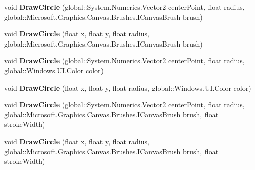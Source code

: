 \begin{DoxyCompactItemize}
void {\bfseries Draw\+Circle} (global\+::\+System.\+Numerics.\+Vector2 center\+Point, float radius, global\+::\+Microsoft.\+Graphics.\+Canvas.\+Brushes.\+I\+Canvas\+Brush brush)
\item 
\mbox{\label{interface_microsoft_1_1_graphics_1_1_canvas_1_1_i_canvas_drawing_session_af7c160387eafb948f3c310d4ae7f78d2}} 
void {\bfseries Draw\+Circle} (float x, float y, float radius, global\+::\+Microsoft.\+Graphics.\+Canvas.\+Brushes.\+I\+Canvas\+Brush brush)
\item 
\mbox{\label{interface_microsoft_1_1_graphics_1_1_canvas_1_1_i_canvas_drawing_session_a41acf0e619b661268925f5cb2e6bf330}} 
void {\bfseries Draw\+Circle} (global\+::\+System.\+Numerics.\+Vector2 center\+Point, float radius, global\+::\+Windows.\+U\+I.\+Color color)
\item 
\mbox{\label{interface_microsoft_1_1_graphics_1_1_canvas_1_1_i_canvas_drawing_session_ad80cf99f40aa32997e96d33202fc5d88}} 
void {\bfseries Draw\+Circle} (float x, float y, float radius, global\+::\+Windows.\+U\+I.\+Color color)
\item 
\mbox{\label{interface_microsoft_1_1_graphics_1_1_canvas_1_1_i_canvas_drawing_session_a63a1527d82dc4d26bdba8b57c41b472a}} 
void {\bfseries Draw\+Circle} (global\+::\+System.\+Numerics.\+Vector2 center\+Point, float radius, global\+::\+Microsoft.\+Graphics.\+Canvas.\+Brushes.\+I\+Canvas\+Brush brush, float stroke\+Width)
\item 
\mbox{\label{interface_microsoft_1_1_graphics_1_1_canvas_1_1_i_canvas_drawing_session_ae8d54b0512ca1a4b91f8830aed1bc33c}} 
void {\bfseries Draw\+Circle} (float x, float y, float radius, global\+::\+Microsoft.\+Graphics.\+Canvas.\+Brushes.\+I\+Canvas\+Brush brush, float stroke\+Width)
\item 
\mbox{\label{interface_microsoft_1_1_graphics_1_1_canvas_1_1_i_canvas_drawing_session_a1b3203ea3b7765772ef9037c131e2b6d}} 

\end{DoxyCompactItemize}
